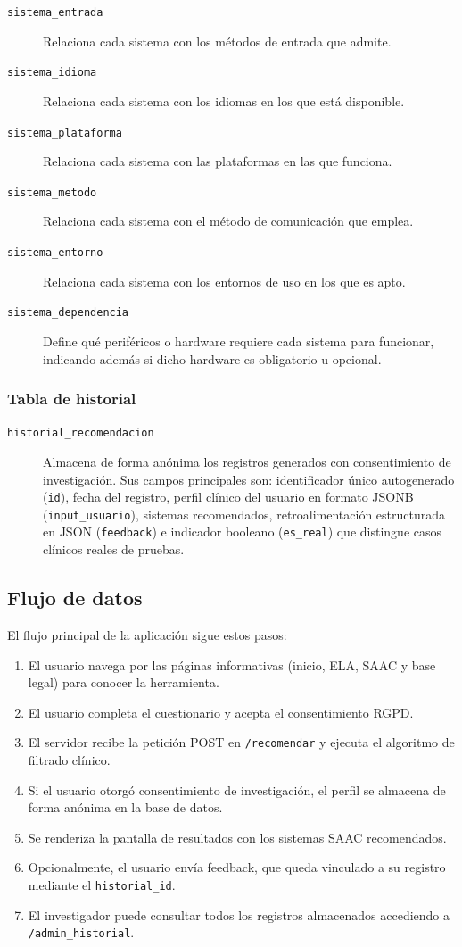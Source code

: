 \begin{description}
	\item[\texttt{sistema\_entrada}] Relaciona cada sistema con los métodos de entrada que admite.
	\item[\texttt{sistema\_idioma}] Relaciona cada sistema con los idiomas en los que está disponible.
	\item[\texttt{sistema\_plataforma}] Relaciona cada sistema con las plataformas en las que funciona.
	\item[\texttt{sistema\_metodo}] Relaciona cada sistema con el método de comunicación que emplea.
	\item[\texttt{sistema\_entorno}] Relaciona cada sistema con los entornos de uso en los que es apto.
	\item[\texttt{sistema\_dependencia}] Define qué periféricos o hardware requiere cada sistema para funcionar, indicando además si dicho hardware es obligatorio u opcional.
\end{description}

\subsubsection{Tabla de historial}
\begin{description}
	 \item[\texttt{historial\_recomendacion}] Almacena de forma anónima los registros generados con consentimiento de investigación. Sus campos principales son: identificador único autogenerado (\texttt{id}), fecha del registro, perfil clínico del usuario en formato JSONB (\texttt{input\_usuario}), sistemas recomendados, retroalimentación estructurada en JSON (\texttt{feedback}) e indicador booleano (\texttt{es\_real}) que distingue casos clínicos reales de pruebas.
\end{description}

\subsection{Flujo de datos}
El flujo principal de la aplicación sigue estos pasos:

\begin{enumerate}
	\item El usuario navega por las páginas informativas (inicio, ELA, SAAC y base legal) para conocer la herramienta.
	\item El usuario completa el cuestionario y acepta el consentimiento RGPD.
	\item El servidor recibe la petición POST en \texttt{/recomendar} y ejecuta el algoritmo de filtrado clínico.
	\item Si el usuario otorgó consentimiento de investigación, el perfil se almacena de forma anónima en la base de datos.
	\item Se renderiza la pantalla de resultados con los sistemas SAAC recomendados.
	\item Opcionalmente, el usuario envía feedback, que queda vinculado a su registro mediante el \texttt{historial\_id}.
	\item El investigador puede consultar todos los registros almacenados accediendo a \texttt{/admin\_historial}.
\end{enumerate}

